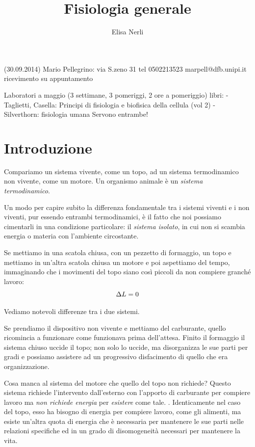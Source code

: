\documentclass[a4paper,12pt]{article}
\begin{document}
\author{Elisa Nerli}
\title{Fisiologia generale}
\maketitle
\newpage
\tableofcontents
\newpage
\listoftodos

(30.09.2014)
Mario Pellegrino: via S.zeno 31 tel 0502213523 marpell@dfb.unipi.it
ricevimento su appuntamento

Laboratori a maggio (3 settimane, 3 pomeriggi, 2 ore a pomeriggio)
libri: - Taglietti, Casella: Principi di fisiologia e biofisica della cellula (vol 2) 	
	   - Silverthorn: fisiologia umana
Servono entrambe!

\section{Introduzione}
Compariamo un sistema vivente, come un topo, ad un sistema termodinamico non vivente, come un motore. Un organismo animale è un \emph{sistema termodinamico}. 

Un modo per capire subito la differenza fondamentale tra i sistemi viventi e i non viventi, pur essendo entrambi termodinamici, è il fatto che noi possiamo cimentarli in una condizione particolare: il \emph{sistema isolato}, in cui non si scambia energia o materia con l'ambiente circostante. 

Se mettiamo in una scatola chiusa, con un pezzetto di formaggio, un topo e mettiamo in un'altra scatola chiusa un motore e poi aspettiamo del tempo, immaginando che i movimenti del topo siano così piccoli da non compiere granché lavoro:
\begin{equation*}
\centering
\Delta L = 0 
\end{equation*}

Vediamo notevoli differenze tra i due sistemi.

Se prendiamo il dispositivo non vivente e mettiamo del carburante, quello ricomincia a funzionare come funzionava prima dell'attesa. Finito il formaggio il sistema chiuso uccide il topo; non solo lo uccide, ma disorganizza le sue parti per gradi e possiamo assistere ad un progressivo disfacimento di quello che era organizzazione.

Cosa manca al sistema del motore che quello del topo non richiede? Questo sistema richiede l'intervento dall'esterno con l'apporto di carburante per compiere lavoro ma \emph{non richiede energia} per \emph{esistere} come tale. . Identicamente nel caso del topo, esso ha bisogno di energia per compiere lavoro, come gli alimenti, ma esiste un'altra quota di energia che è necessaria per mantenere le sue parti nelle relazioni specifiche ed in un grado di disomogeneità necessari per mantenere la vita.
\end{document}
